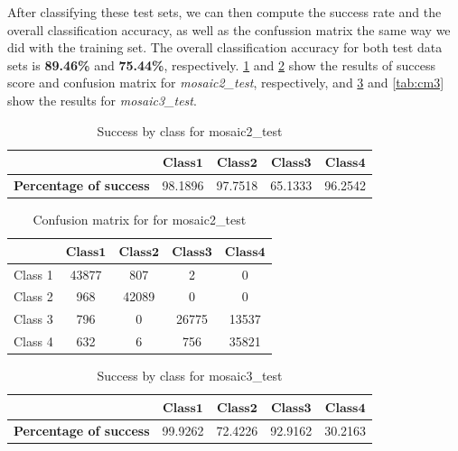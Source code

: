 \documentclass[a4paper, article, oneside, UKenglish]{memoir}
\newcommand{\0}{\mathbf{0}}
\newcommand{\1}{\mathbf{1}}
\begin{document}
After classifying these test sets, we can then compute the success rate and the overall classification accuracy, as well as the confussion matrix the same way we did with the training set. The overall classification accuracy for both test data sets is \textbf{89.46\%} and \textbf{75.44\%}, respectively. \cref{tab:ps2} and \cref{tab:cm2} show the results of success score and confusion matrix for \textit{mosaic2\_test}, respectively, and \cref{tab:ps3} and \cref{tab:cm3} show the results for \textit{mosaic3\_test}. \\

\begin{table}[H]
    \centering
    \begin{tabular}{ccccc}
        \toprule
        \(\boldsymbol{}\) & \(\boldsymbol{Class 1}\) & \(\boldsymbol{Class 2}\) & \(\boldsymbol{Class 3}\) & \(\boldsymbol{Class 4}\)
        \\
        \midrule
        \textbf{Percentage of success} & 98.1896 & 97.7518 & 65.1333 & 96.2542
	\\
        \bottomrule
    \end{tabular}
    \caption{Success by class for mosaic2\_test}
    \label{tab:ps2}
\end{table}

\begin{table}[H]
    \centering
    \begin{tabular}{ccccc}
        \toprule
        \(\boldsymbol{}\) & \(\boldsymbol{Class 1}\) & \(\boldsymbol{Class 2}\) & \(\boldsymbol{Class 3}\) & \(\boldsymbol{Class 4}\)
        \\
        \midrule
        Class 1 & 43877 & 807 & 2 & 0
	\\
	Class 2 & 968 & 42089 & 0 & 0
	\\
	Class 3 & 796 & 0 & 26775 & 13537
	\\
	Class 4 & 632 & 6 & 756 & 35821
        \\
        \bottomrule
    \end{tabular}
    \caption{Confusion matrix for for mosaic2\_test}
    \label{tab:cm2}
\end{table}

\begin{table}[H]
    \centering
    \begin{tabular}{ccccc}
        \toprule
        \(\boldsymbol{}\) & \(\boldsymbol{Class 1}\) & \(\boldsymbol{Class 2}\) & \(\boldsymbol{Class 3}\) & \(\boldsymbol{Class 4}\)
        \\
        \midrule
        \textbf{Percentage of success} & 99.9262 & 72.4226 & 92.9162 & 30.2163
	\\
        \bottomrule
    \end{tabular}
    \caption{Success by class for mosaic3\_test}
    \label{tab:ps3}
\end{table}
\end{document}

